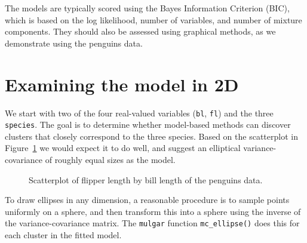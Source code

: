 \documentclass[
  letterpaper,
]{krantz}
\begin{document}

The models are typically scored using the Bayes Information Criterion
(BIC), which is based on the log likelihood, number of variables, and
number of mixture components. They should also be assessed using
graphical methods, as we demonstrate using the penguins data.

\section{Examining the model in 2D}\label{examining-the-model-in-2d}

We start with two of the four real-valued variables (\texttt{bl},
\texttt{fl}) and the three \texttt{species}. The goal is to determine
whether model-based methods can discover clusters that closely
correspond to the three species. Based on the scatterplot in
Figure~\ref{fig-penguins-bl-fl} we would expect it to do well, and
suggest an elliptical variance-covariance of roughly equal sizes as the
model.

\begin{figure}


\caption{\label{fig-penguins-bl-fl}Scatterplot of flipper length by bill
length of the penguins data.}

\end{figure}%

To draw ellipses in any dimension, a reasonable procedure is to sample
points uniformly on a sphere, and then transform this into a sphere
using the inverse of the variance-covariance matrix. The \texttt{mulgar}
function \texttt{mc\_ellipse()} does this for each cluster in the fitted
model.
\end{document}
